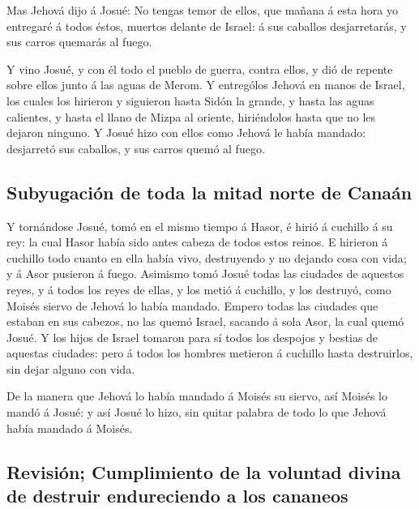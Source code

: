  Mas Jehová dijo á Josué: No tengas temor de ellos, que
mañana á esta hora yo entregaré á todos éstos, muertos delante de
Israel: á sus caballos desjarretarás, y sus carros quemarás al fuego.

 Y vino Josué, y con él todo el pueblo de guerra, contra
ellos, y dió de repente sobre ellos junto á las aguas de Merom.
 Y entrególos Jehová en manos de Israel, los cuales los
hirieron y siguieron hasta Sidón la grande, y hasta las aguas calientes,
y hasta el llano de Mizpa al oriente, hiriéndolos hasta que no les
dejaron ninguno.  Y Josué hizo con ellos como Jehová le
había mandado: desjarretó sus caballos, y sus carros quemó al fuego.

\hypertarget{subyugaciuxf3n-de-toda-la-mitad-norte-de-canauxe1n}{%
\subsection{Subyugación de toda la mitad norte de
Canaán}\label{subyugaciuxf3n-de-toda-la-mitad-norte-de-canauxe1n}}

 Y tornándose Josué, tomó en el mismo tiempo á Hasor, é
hirió á cuchillo á su rey: la cual Hasor había sido antes cabeza de
todos estos reinos.  E hirieron á cuchillo todo cuanto en
ella había vivo, destruyendo y no dejando cosa con vida; y á Asor
pusieron á fuego.  Asimismo tomó Josué todas las ciudades
de aquestos reyes, y á todos los reyes de ellas, y los metió á cuchillo,
y los destruyó, como Moisés siervo de Jehová lo había mandado.
 Empero todas las ciudades que estaban en sus cabezos, no
las quemó Israel, sacando á sola Asor, la cual quemó Josué.
 Y los hijos de Israel tomaron para sí todos los despojos y
bestias de aquestas ciudades: pero á todos los hombres metieron á
cuchillo hasta destruirlos, sin dejar alguno con vida.

 De la manera que Jehová lo había mandado á Moisés su
siervo, así Moisés lo mandó á Josué: y así Josué lo hizo, sin quitar
palabra de todo lo que Jehová había mandado á Moisés.

\hypertarget{revisiuxf3n-cumplimiento-de-la-voluntad-divina-de-destruir-endureciendo-a-los-cananeos}{%
\subsection{Revisión; Cumplimiento de la voluntad divina de destruir
endureciendo a los
cananeos}\label{revisiuxf3n-cumplimiento-de-la-voluntad-divina-de-destruir-endureciendo-a-los-cananeos}}

